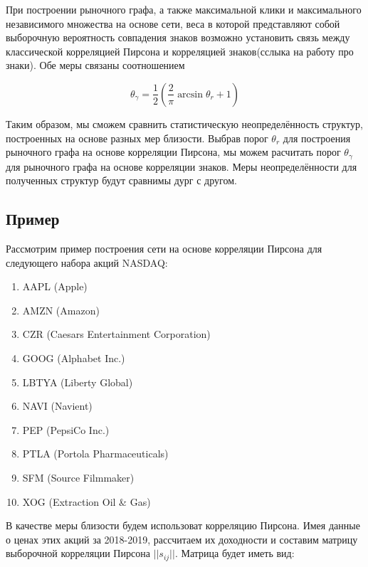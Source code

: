 При построении  рыночного графа, а также максимальной клики и максимального независимого множества на основе сети, веса в которой представляют собой выборочную вероятность совпадения знаков
 возможно установить связь между классической корреляцией Пирсона и корреляцией знаков(сслыка на работу про знаки). Обе меры связаны соотношением

\begin{equation}
	\theta_\gamma = \frac{1}{2}\left(\frac{2}{\pi}\arcsin\theta_r +1\right)
	\label{eq:threshold}
\end{equation}

Таким образом, мы сможем сравнить статистическую неопределённость структур, построенных на основе разных мер близости. Выбрав порог $\theta_r$ для построения рыночного графа на основе корреляции Пирсона, мы можем расчитать порог $\theta_{\gamma}$ для рыночного графа на основе корреляции знаков. Меры неопределённости для полученных структур будут сравнимы дург с другом.



\subsection{Пример}

Рассмотрим пример построения сети на основе корреляции Пирсона для следующего набора акций NASDAQ: 

{ \small
\begin{enumerate}
  \item AAPL (Apple)
  \item AMZN (Amazon)
  \item CZR (Caesars Entertainment Corporation)
  \item GOOG (Alphabet Inc.)
  \item LBTYA (Liberty Global)
  \item NAVI (Navient)
  \item PEP (PepsiCo Inc.)
  \item PTLA (Portola Pharmaceuticals)
  \item SFM (Source Filmmaker)
  \item XOG (Extraction Oil \& Gas)
\end{enumerate}
}
В качестве меры близости будем использоват корреляцию Пирсона. Имея данные о ценах этих акций за 2018-2019, рассчитаем их доходности и составим матрицу выборочной корреляции Пирсона $ ||s_{ij}|| $. Матрица будет иметь вид:


